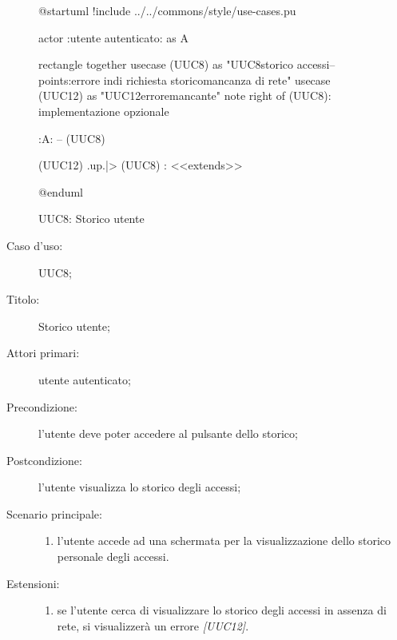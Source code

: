 \documentclass[../../../analisi-dei-requisiti.tex]{subfiles}
\begin{document}
\begin{figure}[H]
  \centering
  \begin{plantuml}
  @startuml
  !include ../../commons/style/use-cases.pu

  actor :utente autenticato: as A

  rectangle {
    together {
      usecase (UUC8) as "UUC8\nVisualizzazione storico accessi\n--\nExtension points:\nVisualizzazione errore in\ncaso di richiesta storico\nin mancanza di rete"
      usecase (UUC12) as "UUC12\nVisualizzazione errore\nrete mancante"
      note right of (UUC8): implementazione opzionale
    }
  }

  :A: -- (UUC8)

  (UUC12) .up.|> (UUC8) : <<extends>>

  @enduml
  \end{plantuml}
  \caption{UUC8: Storico utente}%
  \label{fig:uuc8}
\end{figure}

\begin{description}
  \item[Caso d’uso:] UUC8;
  \item[Titolo:] Storico utente;
  \item[Attori primari:] utente autenticato;
  \item[Precondizione:]  l'utente deve poter accedere al pulsante dello storico;
  \item[Postcondizione:] l'utente visualizza lo storico degli accessi;
  \item[Scenario principale:]
        \begin{enumerate}
          \item l'utente accede ad una schermata per la visualizzazione dello storico personale degli accessi.
        \end{enumerate}
  \item[Estensioni:]
        \begin{enumerate}
          \item se l'utente cerca di visualizzare lo storico degli accessi in assenza di rete, si visualizzerà un errore \emph{[UUC12]}.
        \end{enumerate}
\end{description}
\end{document}
